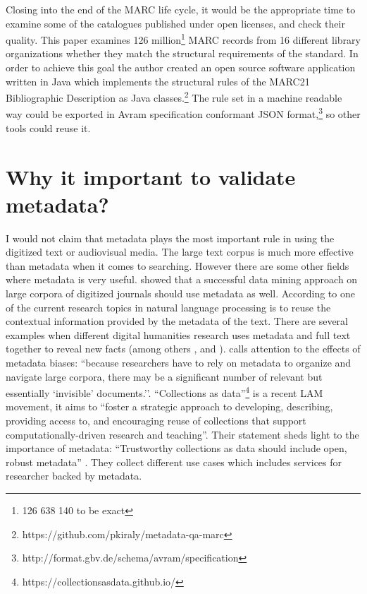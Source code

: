 Closing into the end of the MARC life cycle, it would be the appropriate time to examine some of the catalogues published under open licenses, and check their quality. This paper examines 126 million\footnote{126 638 140 to be exact} MARC records from 16 different library organizations whether they match the structural requirements of the standard. In order to achieve this goal the author created an open source software application written in Java which implements the structural rules of the MARC21 Bibliographic Description as Java classes.\footnote{https://github.com/pkiraly/metadata-qa-marc} The rule set in a machine readable way could be exported in Avram specification conformant JSON format,\footnote{http://format.gbv.de/schema/avram/specification} so other tools could reuse it.

\section{Why it important to validate metadata?}

I would not claim that metadata plays the most important rule in using the digitized text or audiovisual media. The large text corpus is much more effective than metadata when it comes to searching. However there are some other fields where metadata is very useful. \cite{moreux2016} showed that a successful data mining approach on large corpora of digitized journals should use metadata as well. According to \cite{nanni2017} one of the current research topics in natural language processing is to reuse the contextual information provided by the metadata of the text. There are several examples when different digital humanities research uses metadata and full text together to reveal new facts (among others \cite{jockers2013}, \cite{smith2017} and \cite{lahti2019}). \cite{brown2016} calls attention to the effects of metadata biases: ``because researchers have to rely on metadata to organize and navigate large corpora, there may be a significant number of relevant but essentially `invisible’ documents.''. ``Collections as data''\footnote{https://collectionsasdata.github.io/} is a recent LAM movement, it aims to ``foster a strategic approach to developing, describing, providing access to, and encouraging reuse of collections that support computationally-driven research and teaching''.  Their statement sheds light to the importance of metadata: ``Trustworthy collections as data should include open, robust metadata'' \cite{santabarbarastatement2017}. They collect different use cases which includes services for researcher backed by metadata.

